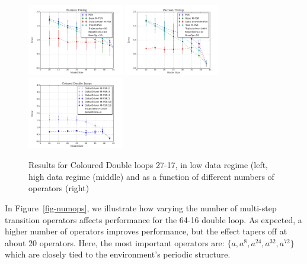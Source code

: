 \documentclass[letterpaper]{article}
\begin{document}
\begin{figure}[t!]
\centering
\includegraphics[width=42mm]{MO_50.png}
%
\includegraphics[width=42mm]{MO_1k.png}
%
%
%
%
\includegraphics[width=42mm]{numOpComparison.png}\vspace*{-4mm}
\caption{Results for Coloured Double loops 27-17, in low data regime (left, high data regime (middle) and as a function of different numbers of operators (right)\label{fig-colnumops}\vspace*{-4mm}}
\end{figure}



In Figure~\ref{fig-numops}, we illustrate how varying the number of multi-step transition operators affects performance for the 64-16 double loop. As expected, a higher number of operators improves performance, but the effect tapers off at about 20 operators. Here, the most important operators are: $\{a,a^{8},a^{24},a^{32},a^{72}\}$ which are closely tied to the environment's periodic structure.

\end{document}
